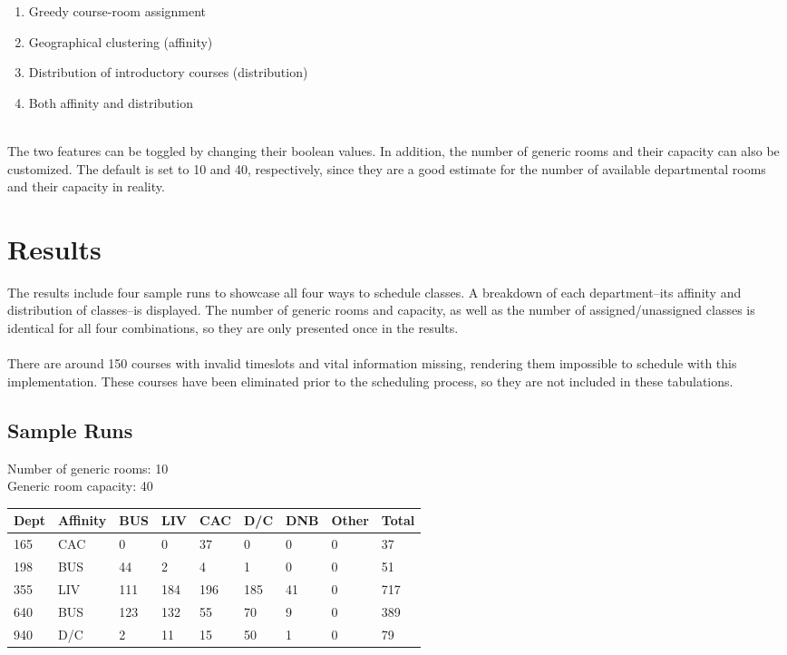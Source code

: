 \documentclass[12pt]{article}
\begin{document}
\begin{enumerate}
	\item Greedy course-room assignment
	\item Geographical clustering (affinity)
	\item Distribution of introductory courses (distribution)
	\item Both affinity and distribution
\end{enumerate}

\hfill\\
The two features can be toggled by changing their boolean values. In addition, the number of generic rooms and their capacity can also be customized. The default is set to 10 and 40, respectively, since they are a good estimate for the number of available departmental rooms and their capacity in reality.

\section{Results}
The results include four sample runs to showcase all four ways to schedule classes. A breakdown of each department--its affinity and distribution of classes--is displayed. The number of generic rooms and capacity, as well as the number of assigned/unassigned classes is identical for all four combinations, so they are only presented once in the results.
\\\\
There are around 150 courses with invalid timeslots and vital information missing, rendering them impossible to schedule with this implementation. These courses have been eliminated prior to the scheduling process, so they are not included in these tabulations.

\subsection{Sample Runs}
	Number of generic rooms: 10 \\
	Generic room capacity: 40
	\begin{center}
		 \label{tab:title} 
		\begin{tabular} { | l | l | l | l | l | l | l | l | l | }
			\hline
			Dept & Affinity & BUS & LIV & CAC & D/C & DNB & Other & Total \\ \hline
			165 & CAC & 0 & 0 & 37 & 0 & 0 & 0 & 37 \\ \hline
			198 & BUS & 44 & 2 & 4 & 1 & 0 & 0 & 51 \\ \hline
			355 & LIV & 111 & 184 & 196 & 185 & 41 & 0 & 717 \\ \hline
			640 & BUS & 123 & 132 & 55 & 70 & 9 & 0 & 389 \\ \hline
			940 & D/C & 2 & 11 & 15 & 50 & 1 & 0 & 79 \\ \hline
		\end{tabular}
	\end{center}
\end{document}
